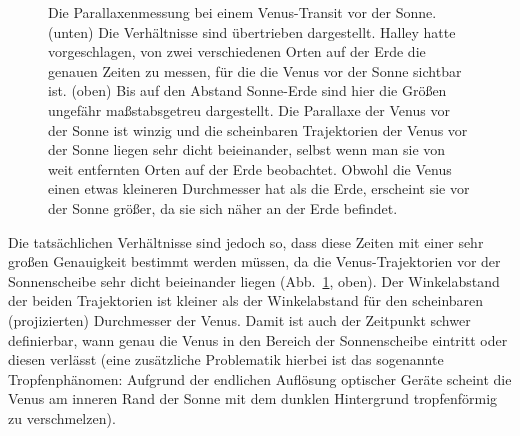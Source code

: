 \begin{figure}[htb]
\caption{\label{fig_Venus}%
Die Parallaxenmessung bei einem Venus-Transit vor der Sonne. (unten) Die Verh\"altnisse sind \"ubertrieben
dargestellt. Halley hatte vorgeschlagen, von zwei verschiedenen Orten auf der Erde die
genauen Zeiten zu messen, f\"ur die die Venus vor der Sonne sichtbar ist. (oben) Bis auf den Abstand
Sonne-Erde sind hier die Gr\"o\ss en ungef\"ahr ma\ss stabsgetreu dargestellt.
Die Parallaxe der Venus vor der Sonne ist winzig und die scheinbaren Trajektorien
der Venus vor der Sonne liegen sehr dicht beieinander, selbst wenn man sie von weit
entfernten Orten auf der Erde beobachtet. Obwohl die Venus einen etwas kleineren Durchmesser hat
als die Erde, erscheint sie vor der Sonne gr\"o\ss er, da sie sich n\"aher an der Erde befindet.}
\end{figure}

Die tats\"achlichen Verh\"altnisse sind jedoch so, dass diese Zeiten mit einer sehr gro\ss en
Genauigkeit bestimmt werden m\"ussen, da die Venus-Trajektorien vor der Sonnenscheibe
sehr dicht beieinander liegen (Abb.\ \ref{fig_Venus}, oben). Der Winkelabstand der beiden
Trajektorien ist kleiner als der Winkelabstand f\"ur den scheinbaren (projizierten) Durchmesser der Venus. 
Damit ist auch der Zeitpunkt schwer definierbar, wann genau die Venus in den Bereich der Sonnenscheibe 
eintritt oder diesen verl\"asst (eine zus\"atzliche Problematik hierbei ist das sogenannte 
Tropfenph\"anomen:
Aufgrund der endlichen Aufl\"osung optischer Ger\"ate scheint die Venus am inneren Rand der Sonne 
mit dem dunklen Hintergrund tropfenf\"ormig zu verschmelzen).

